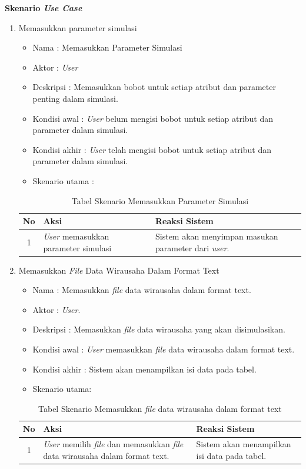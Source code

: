 \textbf{Skenario \textit{Use Case}}
\begin{enumerate}
	\item Memasukkan parameter simulasi
	
		\begin{itemize}
			\item Nama : Memasukkan Parameter Simulasi
			\item Aktor : \textit{User}
			\item Deskripsi : Memasukkan bobot untuk setiap atribut dan parameter penting dalam simulasi.
			\item Kondisi awal : \textit{User} belum mengisi bobot untuk setiap atribut dan parameter dalam simulasi.
			\item Kondisi akhir : \textit{User} telah mengisi bobot untuk setiap atribut dan parameter dalam simulasi.
			\item Skenario utama :
		\end{itemize}
		
\begin{table}[H]
\centering
\caption{Tabel Skenario Memasukkan Parameter Simulasi}
\begin{tabular}{|c|p{7cm}|p{7cm}|}
\hline
No & Aksi & Reaksi Sistem\\
\hline
1 & \textit{User} memasukkan parameter simulasi & Sistem akan menyimpan masukan parameter dari \textit{user}.\\
\hline
\end{tabular}
\label{tabelSkenario1}
\end{table}

	\item Memasukkan \textit{File} Data Wirausaha Dalam Format Text
	\begin{itemize}
		\item Nama : Memasukkan \textit{file} data wirausaha dalam format text.
		\item Aktor : \textit{User}.
		\item Deskripsi : Memasukkan \textit{file} data wirausaha yang akan disimulasikan.
		\item Kondisi awal : \textit{User} memasukkan \textit{file} data wirausaha dalam format text.
		\item Kondisi akhir : Sistem akan menampilkan isi data pada tabel.
		\item Skenario utama:
	\end{itemize}
	
	\begin{table}[H]
\centering
\caption{Tabel Skenario Memasukkan \textit{file} data wirausaha dalam format text}
\begin{tabular}{|c|p{7cm}|p{7cm}|}
\hline
No & Aksi & Reaksi Sistem\\
\hline
1 & \textit{User} memilih \textit{file} dan memasukkan \textit{file} data wirausaha dalam format text. & Sistem akan menampilkan isi data pada tabel. \\
\hline
\end{tabular}
\label{tabelSkenario2}
\end{table}


\end{enumerate}
